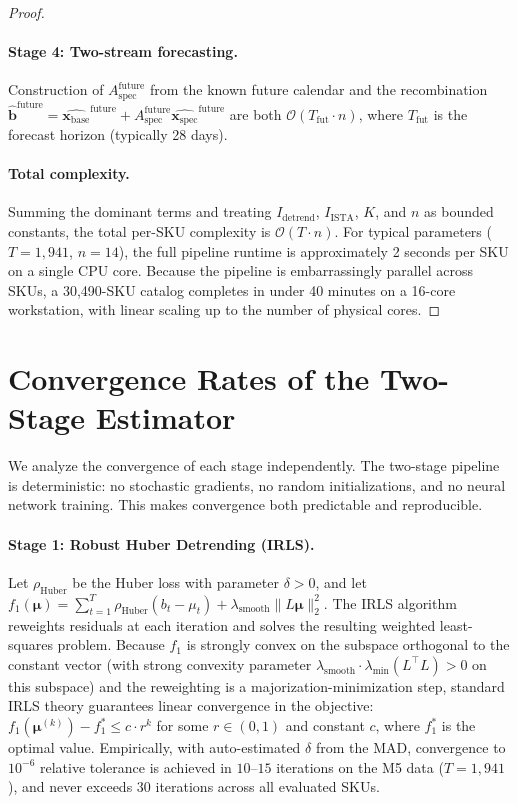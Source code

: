 \documentclass[10pt]{article} %
\theoremstyle{plain}
\theoremstyle{definition}
\newcommand{\xbase}{\mathbf{x}_{\text{base}}}
\newcommand{\xspec}{\mathbf{x}_{\text{spec}}}
\newcommand{\Aspec}{A_{\text{spec}}}
\begin{document}
\begin{proof}
\paragraph{Stage 4: Two-stream forecasting.} Construction of $\Aspec^{\text{future}}$ from the known future calendar and the recombination $\hat{\mathbf{b}}^{\text{future}} = \hat{\xbase}^{\text{future}} + \Aspec^{\text{future}} \hat{\xspec}^{\text{future}}$ are both $\mathcal{O}(T_{\text{fut}} \cdot n)$, where $T_{\text{fut}}$ is the forecast horizon (typically 28 days).

\paragraph{Total complexity.} Summing the dominant terms and treating $I_{\text{detrend}}$, $I_{\text{ISTA}}$, $K$, and $n$ as bounded constants, the total per-SKU complexity is $\mathcal{O}(T \cdot n)$. For typical parameters ($T = 1{,}941$, $n = 14$), the full pipeline runtime is approximately 2 seconds per SKU on a single CPU core. Because the pipeline is embarrassingly parallel across SKUs, a 30{,}490-SKU catalog completes in under 40 minutes on a 16-core workstation, with linear scaling up to the number of physical cores.
\end{proof}


\section{Convergence Rates of the Two-Stage Estimator}
\label{app:convergence}

We analyze the convergence of each stage independently. The two-stage pipeline is deterministic: no stochastic gradients, no random initializations, and no neural network training. This makes convergence both predictable and reproducible.

\paragraph{Stage 1: Robust Huber Detrending (IRLS).} Let $\rho_{\text{Huber}}$ be the Huber loss with parameter $\delta > 0$, and let $f_1(\boldsymbol{\mu}) = \sum_{t=1}^{T} \rho_{\text{Huber}}(b_t - \mu_t) + \lambda_{\text{smooth}} \|L \boldsymbol{\mu}\|_2^2$. The IRLS algorithm reweights residuals at each iteration and solves the resulting weighted least-squares problem. Because $f_1$ is strongly convex on the subspace orthogonal to the constant vector (with strong convexity parameter $\lambda_{\text{smooth}} \cdot \lambda_{\min}(L^\top L) > 0$ on this subspace) and the reweighting is a majorization-minimization step, standard IRLS theory guarantees linear convergence in the objective: $f_1(\boldsymbol{\mu}^{(k)}) - f_1^* \leq c \cdot r^k$ for some $r \in (0,1)$ and constant $c$, where $f_1^*$ is the optimal value. Empirically, with auto-estimated $\delta$ from the MAD, convergence to $10^{-6}$ relative tolerance is achieved in $10$--$15$ iterations on the M5 data ($T = 1{,}941$), and never exceeds $30$ iterations across all evaluated SKUs.
\end{document}

